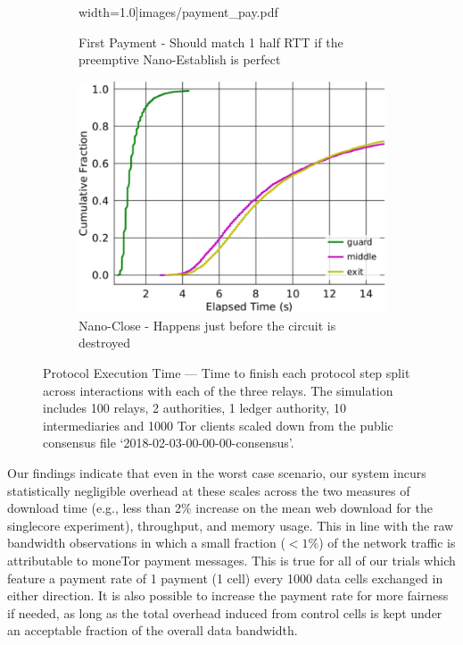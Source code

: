 \begin{figure}[t]
\begin{subfigure}[t]{0.32\textwidth}
  width=1.0\textwidth]{images/payment_pay.pdf}
		\caption{First Payment - Should match 1 half RTT if the
                  preemptive Nano-Establish is perfect}
\label{fig:ttfp}
	\end{subfigure}
	\begin{subfigure}[t]{0.32\textwidth} \centering
\includegraphics[trim={0 0cm 0 0cm}, clip,
  width=1.0\textwidth]{images/payment_close.pdf}
		\caption{Nano-Close - Happens just before the circuit is
                  destroyed}
\label{fig:payments_close}
	\end{subfigure}
	\caption{Protocol Execution Time --- Time to finish each protocol step
          split across interactions with each of the three relays. The
          simulation includes 100 relays, 2 authorities, 1 ledger authority, 10
          intermediaries and 1000 Tor clients scaled down from the public
          consensus file `2018-02-03-00-00-00-consensus'.}
\label{fig:latencymeasurements}
\end{figure}

Our findings indicate that even in the worst case scenario, our system incurs
statistically negligible overhead at these scales across the two measures of
download time (e.g., less than 2\% increase on the mean web download for the
singlecore experiment), throughput, and memory usage. This in line with the raw
bandwidth observations in which a small fraction ($< 1\%$) of the network
traffic is attributable to moneTor payment messages. This is true for all of our
trials which feature a payment rate of 1 payment (1 cell) every 1000 data cells
exchanged in either direction. It is also possible to increase the payment rate
for more fairness if needed, as long as the total overhead induced from control
cells is kept under an acceptable fraction of the overall data bandwidth.

